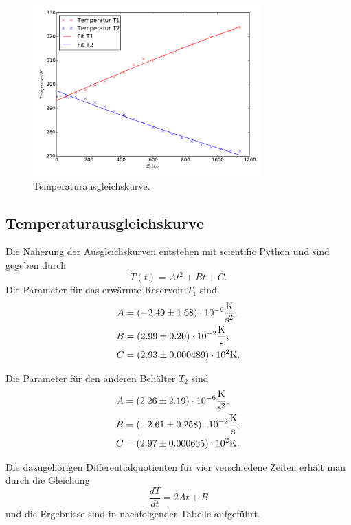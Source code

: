 \begin{figure}
  \centering
  \includegraphics[width=0.78\textwidth]{Temperaturgraphik.pdf}
  \caption{Temperaturausgleichskurve.}
\end{figure}
\newpage
\subsection{Temperaturausgleichskurve}
Die Näherung der Ausgleichskurven entstehen mit scientific Python und sind gegeben durch
\begin{equation}
  T(t)=At^2+Bt+C .
\end{equation}
Die Parameter für das erwärmte Reservoir $T_1$ sind
\begin{align*}
  A &=(-2.49\pm1.68)\cdot10^{-6}\si{\frac{\kelvin}{\second^2}}, \\
  B &=(2.99\pm0.20)\cdot10^{-2}\si{\frac{\kelvin}{\second}}, \\
  C &=(2.93\pm0.000489)\cdot10^{2}\si{\kelvin}.
\end{align*}

Die Parameter für den anderen Behälter $T_2$ sind
\begin{align*}
  A &= (2.26\pm2.19)\cdot10^{-6}\si{\frac{\kelvin}{\second^2}}, \\
  B &= (-2.61\pm0.258)\cdot10^{-2}\si{\frac{\kelvin}{\second}}, \\
  C &= (2.97\pm0.000635)\cdot10^{2}\si{\kelvin}.
\end{align*}

Die dazugehörigen Differentialquotienten für vier verschiedene Zeiten erhält man
durch die Gleichung
\begin{equation}
  \frac{dT}{dt}=2At+B
\end{equation}
und die Ergebnisse sind in nachfolgender Tabelle aufgeführt.

